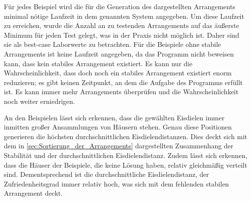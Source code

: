 \documentclass[a4paper,10pt,ngerman,captions=figureheading]{scrartcl}
\begin{document}
Für jedes Beispiel wird die für die Generation des dargestellten Arrangements minimal nötige Laufzeit in dem genannten System angegeben.
Um diese Laufzeit zu erreichen, wurde die Anzahl an zu testenden Arrangements auf das äußerste Minimum für jeden Test gelegt, was in der Praxis nicht möglich ist.
Daher sind sie als best-case Laborwerte zu betrachten.
Für die Beispiele ohne stabile Arrangements ist keine Laufzeit angegeben, da das Programm nicht beweisen kann, dass kein stabiles Arrangement existiert.
Es kann nur die Wahrscheinlichkeit, dass doch noch ein stabiles Arrangement existiert enorm reduzieren; es gibt keinen Zeitpunkt, an dem die Aufgabe des Programms erfüllt ist.
Es kann immer mehr Arrangements überprüfen und die Wahrscheinlichkeit noch weiter erniedrigen.

An den Beispielen lässt sich erkennen, dass die gewählten Eisdielen immer inmitten großer Ansammlungen von Häusern stehen.
Genau diese Positionen generieren die höchsten durchschnittlichen Eisdielendistanzen.
Dies deckt sich mit dem in \autoref{sec:Sortierung_der_Arrangements} dargestellten Zusammenhang der Stabilität und der durchschnittlichen Eisdielendistanz.
Zudem lässt sich erkennen, dass die Häuser der Beispiele, die keine Lösung haben, relativ gleichmäßig verteilt sind.
Dementsprechend ist die durchschnittliche Eisdielendistanz, der \glqq Zufriedenheitsgrad\grqq{} immer relativ hoch, was sich mit dem fehlenden stabilen Arrangement deckt.
\end{document}
